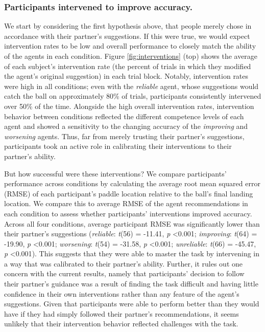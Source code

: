 \documentclass[10pt,letterpaper]{article}
\begin{document}
\subsubsection{Participants intervened to improve accuracy.} 

We start by considering the first hypothesis above, that people merely chose in accordance with their partner's suggestions. If this were true, we would expect intervention rates to be low and overall performance to closely match the ability of the agents in each condition. Figure \ref{fig:interventions} (top) shows the average of each subject's intervention rate (the percent of trials in which they modified the agent's original suggestion) in each trial block. Notably, intervention rates were high in all conditions; even with the \textit{reliable} agent, whose suggestions would catch the ball on approximately 80\% of trials, participants consistently intervened over 50\% of the time. Alongside the high overall intervention rates, intervention behavior between conditions reflected the different competence levels of each agent and showed a sensitivity to the changing accuracy of the \textit{improving} and \textit{worsening} agents. Thus, far from merely trusting their partner's suggestions, participants took an active role in calibrating their interventions to their partner's ability.

But how successful were these interventions? We compare participants' performance across conditions by calculating the average root mean squared error (RMSE) of each participant's paddle location relative to the ball's final landing location. We compare this to average RMSE of the agent recommendations in each condition to assess whether participants' interventions improved accuracy. Across all four conditions, average participant RMSE was significantly lower than their partner's suggestions (\textit{reliable}: \textit{t}(56) = -11.41, \textit{p} \textless{0.001}; \textit{improving}: \textit{t}(64) = -19.90, \textit{p} \textless{0.001}; \textit{worsening}: \textit{t}(54) = -31.58, \textit{p} \textless{0.001}; \textit{unreliable}: \textit{t}(66) = -45.47, \textit{p} \textless{0.001}). This suggests that they were able to master the task by intervening in a way that was calibrated to their partner's ability. Further, it rules out one concern with the current results, namely that participants' decision to follow their partner's guidance was a result of finding the task difficult and having little confidence in their own interventions rather than any feature of the agent's suggestions. Given that participants were able to perform better than they would have if they had simply followed their partner's recommendations, it seems unlikely that their intervention behavior reflected challenges with the task.
\end{document}
